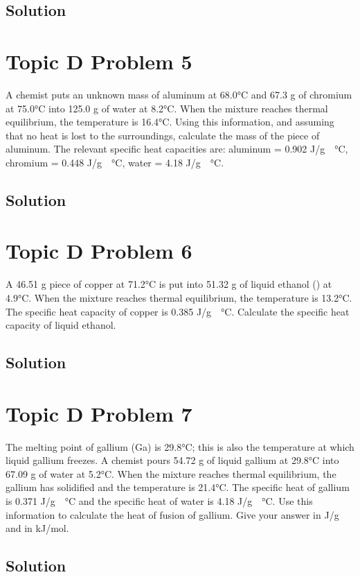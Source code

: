 \documentclass[10pt]{article}
\begin{document}
        \subsection{Solution}

    \pagebreak
    \section{Topic D Problem 5}
        A chemist puts an unknown mass of aluminum at 68.0\unit{\celsius} and 67.3 g of chromium at 75.0\unit{\celsius} into 125.0 g of water at 8.2\unit{\celsius}. 
        When the mixture reaches thermal equilibrium, the temperature is 16.4\unit{\celsius}. 
        Using this information, and assuming that no heat is lost to the surroundings, calculate the mass of the piece of aluminum. 
        The relevant specific heat capacities are: aluminum = 0.902 \unit{\joule/\gram\cdot\celsius}, chromium = 0.448 \unit{\joule/\gram\cdot\celsius}, water = 4.18 \unit{\joule/\gram\cdot\celsius}.

        \subsection{Solution}

    \pagebreak
    \section{Topic D Problem 6}
        A 46.51 g piece of copper at 71.2\unit{\celsius} is put into 51.32 g of liquid ethanol () at 4.9\unit{\celsius}.
        When the mixture reaches thermal equilibrium, the temperature is 13.2\unit{\celsius}. 
        The specific heat capacity of copper is 0.385 \unit{\joule/\gram\cdot\celsius}. 
        Calculate the specific heat capacity of liquid ethanol.

        \subsection{Solution}

    \pagebreak
    \section{Topic D Problem 7}
        The melting point of gallium (Ga) is 29.8\unit{\celsius}; this is also the temperature at which liquid gallium freezes. 
        A chemist pours 54.72 g of liquid gallium at 29.8\unit{\celsius} into 67.09 g of water at 5.2\unit{\celsius}. 
        When the mixture reaches thermal equilibrium, the gallium has solidified and the temperature is 21.4\unit{\celsius}. 
        The specific heat of gallium is 0.371 \unit{\joule/\gram\cdot\celsius} and the specific heat of water is 4.18 \unit{\joule/\gram\cdot\celsius}. 
        Use this information to calculate the heat of fusion of gallium. 
        Give your answer in J/g and in kJ/mol.

        \subsection{Solution}
    
    \pagebreak
    \tableofcontents
\end{document}
